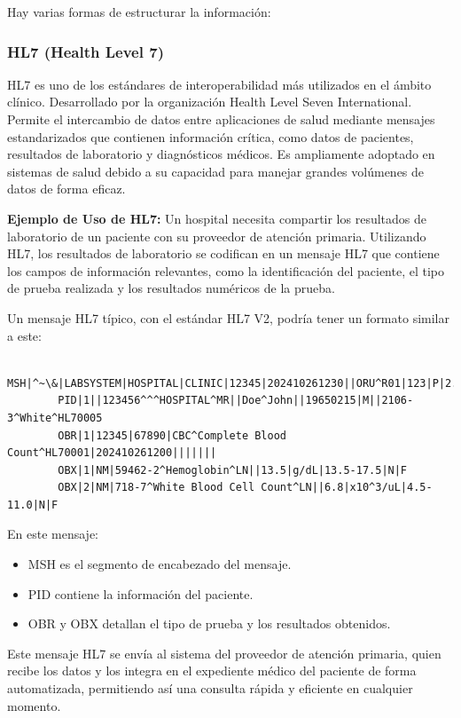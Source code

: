\documentclass[12pt, a4paper, twoside]{article}
\begin{document}
	Hay varias formas de estructurar la información:
	
	\subsubsection{HL7 (Health Level 7)} 
	HL7 es uno de los estándares de interoperabilidad más utilizados en el ámbito clínico. Desarrollado por la organización Health Level Seven International. Permite el intercambio de datos entre aplicaciones de salud mediante mensajes estandarizados que contienen información crítica, como datos de pacientes, resultados de laboratorio y diagnósticos médicos. Es ampliamente adoptado en sistemas de salud debido a su capacidad para manejar grandes volúmenes de datos de forma eficaz. 
	
	
	\textbf{Ejemplo de Uso de HL7:} Un hospital necesita compartir los resultados de laboratorio de un paciente con su proveedor de atención primaria. Utilizando HL7, los resultados de laboratorio se codifican en un mensaje HL7 que contiene los campos de información relevantes, como la identificación del paciente, el tipo de prueba realizada y los resultados numéricos de la prueba.
	
	Un mensaje HL7 típico, con el estándar HL7 V2, podría tener un formato similar a este\cite{meditecsHL7}:
	
	\begin{verbatim}
		MSH|^~\&|LABSYSTEM|HOSPITAL|CLINIC|12345|202410261230||ORU^R01|123|P|2.3
		PID|1||123456^^^HOSPITAL^MR||Doe^John||19650215|M||2106-3^White^HL70005
		OBR|1|12345|67890|CBC^Complete Blood Count^HL70001|202410261200|||||||
		OBX|1|NM|59462-2^Hemoglobin^LN||13.5|g/dL|13.5-17.5|N|F
		OBX|2|NM|718-7^White Blood Cell Count^LN||6.8|x10^3/uL|4.5-11.0|N|F
	\end{verbatim}
	
	
	
	En este mensaje:
	\begin{itemize}
		\item MSH es el segmento de encabezado del mensaje.
		\item PID contiene la información del paciente.
		\item OBR y OBX detallan el tipo de prueba y los resultados obtenidos.
	\end{itemize}
	
	Este mensaje HL7 se envía al sistema del proveedor de atención primaria, quien recibe los datos y los integra en el expediente médico del paciente de forma automatizada, permitiendo así una consulta rápida y eficiente en cualquier momento.
	
\end{document}
